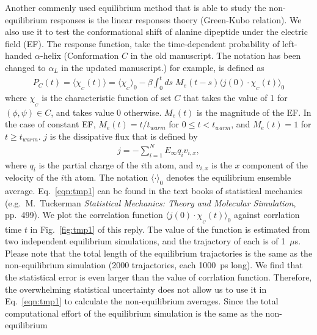 \documentclass[]{revtex4-1}
\begin{document}
Another commenly used equilibrium method that is able to study the non-equilibrium
responses is the linear responses thoery (Green-Kubo relation).
We also use it to test the
conformational shift of alanine dipeptide under the electric field
(EF). The response function, take the time-dependent probability of
left-handed $\alpha$-helix (Conformation $C$ in the old manuscript. The notation has been changed to $\alpha_L$ in the updated manuscript.) for example, is defined as
\begin{align}\label{eqn:tmp1}
  P_C(t) = \langle\chi_{_C}(t)\rangle = \langle \chi_{_C} \rangle_0 -
  \beta \int_0^t ds\; M_e(t - s)\langle j(0)\cdot \chi_{_C}(t) \rangle_0
\end{align}
where $\chi_{_C}$ is the characteristic function of set $C$ that takes
the value of 1 for $(\phi,\psi)\in C$, and takes value 0
otherwise. $M_e(t)$ is the magnitude of the EF. In the case of
constant EF, $M_e(t) = t/t_{warm}$ for $0\leq t<t_{warm}$, and
$M_e(t) = 1$ for $t\geq t_{warm}$.
$j$ is the dissipative flux that is defined by
\begin{align}
  j = - \sum_{i=1}^N E_\infty q_i v_{i,x},
\end{align}
where $q_i$ is the partial charge of the $i$th atom, and $v_{i,x}$ is
the $x$ component of the velocity of the $i$th atom.  The notation
$\langle\cdot\rangle_0$ denotes the equilibrium ensemble average.
Eq.~\eqref{eqn:tmp1} can be found in the text books of statistical
mechanics (e.g.~M.~Tuckerman \emph{Statistical Mechanics: Theory and
  Molecular Simulation}, pp.~499).  We plot the correlation function
$\langle j(0)\cdot \chi_{_C}(t) \rangle_0$ against corrlation time $t$
in Fig.~\ref{fig:tmp1} of this reply. The value of the function is estimated from
two independent equilibrium simulations, and the trajactory of each is
of 1~$\mu$s. Please note that the total length of the equilibrium
trajactories is the same as the non-equilibrium simulation (2000
trajactories, each 1000~ps long).
We find that the statistical error is even larger than the value of
corrlation function.  Therefore, the
overwhelming statistical uncertainty does not allow us to use it 
in Eq.~\eqref{eqn:tmp1} to calculate the
non-equilibrium averages. 
Since the total computational effort of
the equilibrium simulation is the same as the non-equilibrium
\end{document}
